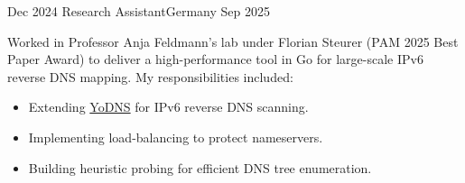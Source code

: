 %
%
%

\begin{experiences}
  \experience
    {Dec 2024} {Research Assistant}{}{Germany}
    {Sep 2025} {
        Worked in Professor Anja Feldmann’s lab under Florian Steurer (PAM 2025 Best Paper Award)
        to deliver a high-performance tool in Go for large-scale IPv6 reverse DNS mapping.
        My responsibilities included:
        \begin{itemize}
            \item Extending \href{https://github.com/DNS-MSMT-INET/yodns}{YoDNS} for IPv6 reverse DNS scanning.
            \item Implementing load-balancing to protect nameservers.
            \item Building heuristic probing for efficient DNS tree enumeration.
        \end{itemize}

}
\end{experiences}
